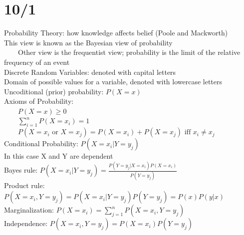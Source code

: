 \documentclass[10pt,letterpaper,unboxed,cm]{article}
\newcommand{\tab}{~~~~}
\begin{document}
\section{10/1}
Probability Theory: how knowledge affects belief (Poole and Mackworth)\\
This view is known as the Bayesian view of probability\\
\tab Other view is the frequentist view; probability is the limit of the relative frequency of an event\\
Discrete Random Variables: denoted with capital letters\\
Domain of possible values for a variable, denoted with lowercase letters\\
Uncoditional (prior) probability: $P(X = x)$\\
Axioms of Probability:\\
\tab $P(X = x) \geq 0$\\
\tab $\sum_{i=1}^n P(X = x_i) = 1$\\
\tab $P(X = x_i \text{ or } X = x_j) = P(X = x_i) + P(X = x_j) \text{ iff } x_i \neq x_j$\\
Conditional Probability: $P(X = x_i | Y = y_j)$\\
In this case X and Y are dependent\\
Bayes rule: $P(X = x_i | Y = y_j) = \frac{P(Y = y_j | X = x_i)P(X = x_i)}{P(Y = y_j)}$\\
Product rule: $P(X = x_i, Y = y_j) = P(X = x_i | Y = y_j)P(Y = y_j) = P(x)P(y|x)$\\
Marginalization: $P(X = x_i) = \sum_{j=1}^n P(X = x_i, Y = y_j)$\\
Independence: $P(X = x_i, Y = y_j) = P(X = x_i)P(Y = y_j)$\\
\end{document}
